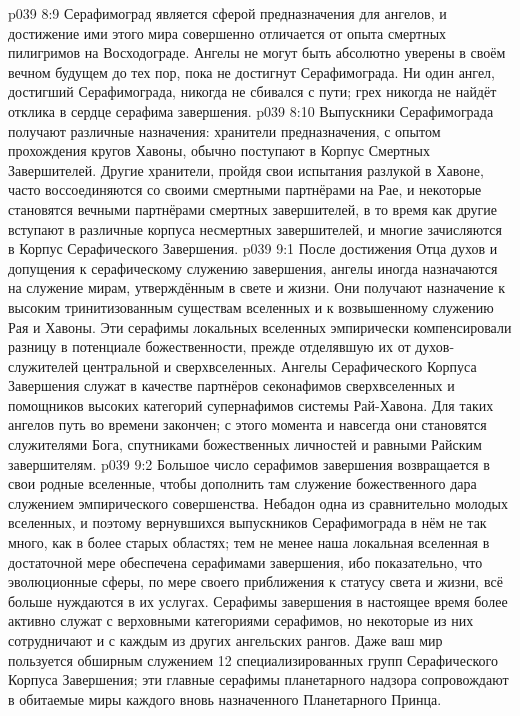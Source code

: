 \vs p039 8:9 \pc Серафимоград является сферой предназначения для ангелов, и достижение ими этого мира совершенно отличается от опыта смертных пилигримов на Восходограде. Ангелы не могут быть абсолютно уверены в своём вечном будущем до тех пор, пока не достигнут Серафимограда. Ни один ангел, достигший Серафимограда, никогда не сбивался с пути; грех никогда не найдёт отклика в сердце серафима завершения.
\vs p039 8:10 Выпускники Серафимограда получают различные назначения: хранители предназначения, с опытом прохождения кругов Хавоны, обычно поступают в Корпус Смертных Завершителей. Другие хранители, пройдя свои испытания разлукой в Хавоне, часто воссоединяются со своими смертными партнёрами на Рае, и некоторые становятся вечными партнёрами смертных завершителей, в то время как другие вступают в различные корпуса несмертных завершителей, и многие зачисляются в Корпус Серафического Завершения.
\vs p039 9:1 После достижения Отца духов и допущения к серафическому служению завершения, ангелы иногда назначаются на служение мирам, утверждённым в свете и жизни. Они получают назначение к высоким тринитизованным существам вселенных и к возвышенному служению Рая и Хавоны. Эти серафимы локальных вселенных эмпирически компенсировали разницу в потенциале божественности, прежде отделявшую их от духов\hyp{}служителей центральной и сверхвселенных. Ангелы Серафического Корпуса Завершения служат в качестве партнёров секонафимов сверхвселенных и помощников высоких категорий супернафимов системы Рай\hyp{}Хавона. Для таких ангелов путь во времени закончен; с этого момента и навсегда они становятся служителями Бога, спутниками божественных личностей и равными Райским завершителям.
\vs p039 9:2 Большое число серафимов завершения возвращается в свои родные вселенные, чтобы дополнить там служение божественного дара служением эмпирического совершенства. Небадон одна из сравнительно молодых вселенных, и поэтому вернувшихся выпускников Серафимограда в нём не так много, как в более старых областях; тем не менее наша локальная вселенная в достаточной мере обеспечена серафимами завершения, ибо показательно, что эволюционные сферы, по мере своего приближения к статусу света и жизни, всё больше нуждаются в их услугах. Серафимы завершения в настоящее время более активно служат с верховными категориями серафимов, но некоторые из них сотрудничают и с каждым из других ангельских рангов. Даже ваш мир пользуется обширным служением 12 специализированных групп Серафического Корпуса Завершения; эти главные серафимы планетарного надзора сопровождают в обитаемые миры каждого вновь назначенного Планетарного Принца.
